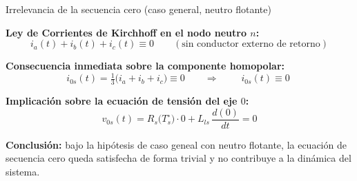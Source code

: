 \documentclass[aspectratio=169,t]{beamer}
\begin{document}
\begin{frame}{Irrelevancia de la secuencia cero (caso general, neutro flotante)}
\vspace{4mm}

\textbf{Ley de Corrientes de Kirchhoff en el nodo neutro $n$:}
\begin{equation*}
i_a(t) + i_b(t) + i_c(t) \equiv 0
\qquad (\text{sin conductor externo de retorno})
\end{equation*}

\textbf{Consecuencia inmediata sobre la componente homopolar:}
\begin{equation*}
i_{0s}(t) = \tfrac{1}{3}\big(i_a + i_b + i_c\big) \equiv 0
\qquad\Longrightarrow\qquad
\boxed{\;i_{0s}(t) \equiv 0\;}
\end{equation*}

\textbf{Implicación sobre la ecuación de tensión del eje $0$:}
\begin{equation*}
v_{0s}(t) = R_s\!\big(T_s^\circ\big)\cdot 0 + L_{ls}\,\frac{d(0)}{dt} = 0
\end{equation*}

{\small \textbf{Conclusión:} bajo la hipótesis de caso geneal con neutro flotante, la ecuación de secuencia cero queda satisfecha de forma trivial y no contribuye a la dinámica del sistema.}
\end{frame}
\end{document}

